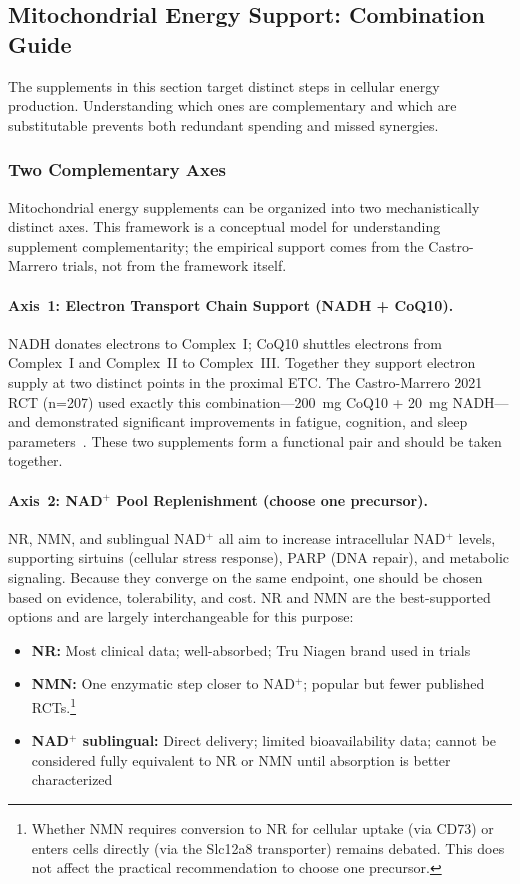 \subsection{Mitochondrial Energy Support: Combination Guide}
\label{subsec:mito-combination-guide}

The supplements in this section target distinct steps in cellular energy production. Understanding which ones are complementary and which are substitutable prevents both redundant spending and missed synergies.

\subsubsection{Two Complementary Axes}

Mitochondrial energy supplements can be organized into two mechanistically distinct axes. This framework is a conceptual model for understanding supplement complementarity; the empirical support comes from the Castro-Marrero trials, not from the framework itself.

\paragraph{Axis~1: Electron Transport Chain Support (NADH + CoQ10).} NADH donates electrons to Complex~I; CoQ10 shuttles electrons from Complex~I and Complex~II to Complex~III. Together they support electron supply at two distinct points in the proximal ETC. The Castro-Marrero 2021 RCT (n=207) used exactly this combination---200~mg CoQ10 + 20~mg NADH---and demonstrated significant improvements in fatigue, cognition, and sleep parameters~\cite{CastroMarrero2021fatigue}. These two supplements form a functional pair and should be taken together.

\paragraph{Axis~2: NAD$^+$ Pool Replenishment (choose one precursor).} NR, NMN, and sublingual NAD$^+$ all aim to increase intracellular NAD$^+$ levels, supporting sirtuins (cellular stress response), PARP (DNA repair), and metabolic signaling. Because they converge on the same endpoint, one should be chosen based on evidence, tolerability, and cost. NR and NMN are the best-supported options and are largely interchangeable for this purpose:
\begin{itemize}
    \item \textbf{NR:} Most clinical data; well-absorbed; Tru Niagen brand used in trials
    \item \textbf{NMN:} One enzymatic step closer to NAD$^+$; popular but fewer published RCTs.\footnote{Whether NMN requires conversion to NR for cellular uptake (via CD73) or enters cells directly (via the Slc12a8 transporter) remains debated. This does not affect the practical recommendation to choose one precursor.}
    \item \textbf{NAD$^+$ sublingual:} Direct delivery; limited bioavailability data; cannot be considered fully equivalent to NR or NMN until absorption is better characterized
\end{itemize}

